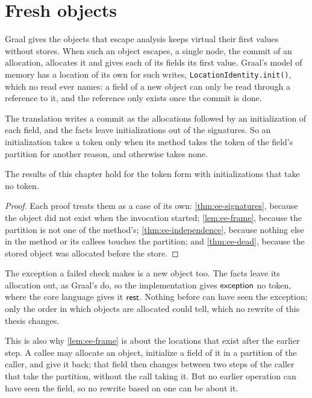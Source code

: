 \section{Fresh objects}\label{sec:ee-fresh}

Graal gives the objects that escape analysis keeps virtual their first values
without stores. When such an object escapes, a single node, the commit of an
allocation, allocates it and gives each of its fields its first value. Graal's
model of memory has a location of its own for such writes,
\texttt{LocationIdentity.init()}, which no read ever names: a field of a new
object can only be read through a reference to it, and the reference only
exists once the commit is done.

The translation writes a commit as the allocations followed by an
initialization of each field, and the facts leave initializations out of the
signatures. So an initialization takes a token only when its method takes the
token of the field's partition for another reason, and otherwise takes none.

\begin{proposition}\label{prop:ee-fresh}
The results of this chapter hold for the token form with initializations that
take no token.
\end{proposition}

\begin{proof}
Each proof treats them as a case of its own: \cref{thm:ee-signatures}, because
the object did not exist when the invocation started; \cref{lem:ee-frame},
because the partition is not one of the method's; \cref{thm:ee-independence},
because nothing else in the method or its callees touches the partition; and
\cref{thm:ee-dead}, because the stored object was allocated before the store.
\end{proof}

The exception a failed check makes is a new object too. The facts leave its
allocation out, as Graal's do, so the implementation gives $\mathsf{exception}$ no token,
where the core language gives it $\mathsf{rest}$. Nothing before can have seen the
exception; only the order in which objects are allocated could tell, which no
rewrite of this thesis changes.

This is also why \cref{lem:ee-frame} is about the locations that exist after
the earlier step. A callee may allocate an object, initialize a field of it in
a partition of the caller, and give it back; that field then changes between two
steps of the caller that take the partition, without the call taking it. But no
earlier operation can have seen the field, so no rewrite based on one can be
about it.

